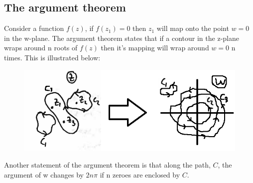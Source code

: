 \subsection{The argument theorem}
Consider a function $f(z)$, if $f(z_1)=0$ then $z_1$ will map onto the point $w=0$ in the w-plane.
 The argument theorem states that if a contour in the z-plane wraps around n roots of $f(z)$ then it's mapping will wrap around $w=0$ n times. 
 This is illustrated below:
\begin{figure}[H]
	\centering
	\includegraphics[width=\linewidth]{complex/argthm}
	\captionsetup{font=small} 	
\end{figure}
\noindent Another statement of the argument theorem is that along the path, $C$, the argument of w changes by $2n\pi$ if n zeroes are enclosed by $C$.